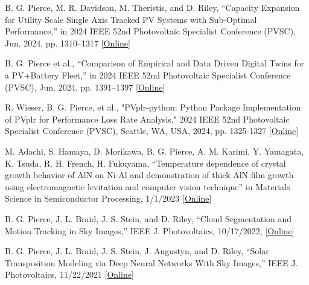 \documentclass[10pt]{article}
\begin{document}
		

	{\begin{newitemize}
    
    \item{ { B. G. Pierce}, M. R. Davidson, M. Theristis, and D. Riley, “Capacity Expansion for Utility Scale Single Axis Tracked PV Systems with Sub-Optimal Performance,” in 2024 IEEE 52nd Photovoltaic Specialist Conference (PVSC), Jun. 2024, pp. 1310–1317  [\href{https://ieeexplore.ieee.org/abstract/document/10748930}{Online}] }
    
    
    
    \item{ { B. G. Pierce} et al., “Comparison of Empirical and Data Driven Digital Twins for a PV+Battery Fleet,” in 2024 IEEE 52nd Photovoltaic Specialist Conference (PVSC), Jun. 2024, pp. 1391–1397 
    [\href{https://ieeexplore.ieee.org/abstract/document/10749422}{Online}] }
    
    
    \item{R. Wieser,  { B. G. Pierce}, et al., "PVplr-python: Python Package Implementation of PVplr for Performance Loss Rate Analysis," 2024 IEEE 52nd Photovoltaic Specialist Conference (PVSC), Seattle, WA, USA, 2024, pp. 1325-1327 [\href{https://ieeexplore.ieee.org/abstract/document/10748958}{Online}] }
    
     \item{M. Adachi, S. Hamaya, D. Morikawa, { B. G. Pierce}, A. M. Karimi, Y. Yamagata, K. Tsuda, R. H. French,  H. Fukuyama, ``Temperature dependence of crystal growth behavior of AlN on Ni-Al and demonstration of thick AlN film growth using electromagnetic levitation and computer vision technique'' in Materials Science in Semiconductor Processing, 1/1/2023 [\href{https://www.sciencedirect.com/science/article/pii/S136980012200693X}{Online}] }
    
     \item{{ B. G. Pierce}, J. L. Braid, J. S. Stein, and D. Riley, ``Cloud Segmentation and Motion Tracking in Sky Images,” IEEE J. Photovoltaics, 10/17/2022, [\href{https://ieeexplore.ieee.org/abstract/document/9950360/}{Online}] }
   
    \item{{ B. G. Pierce}, J. L. Braid, J. S. Stein, J. Augustyn, and D. Riley, ``Solar Transposition Modeling via Deep Neural Networks With Sky Images,” IEEE J. Photovoltaics, 11/22/2021 [\href{https://ieeexplore.ieee.org/abstract/document/9623380}{Online}] }
    

\end{newitemize}}
\end{document}

